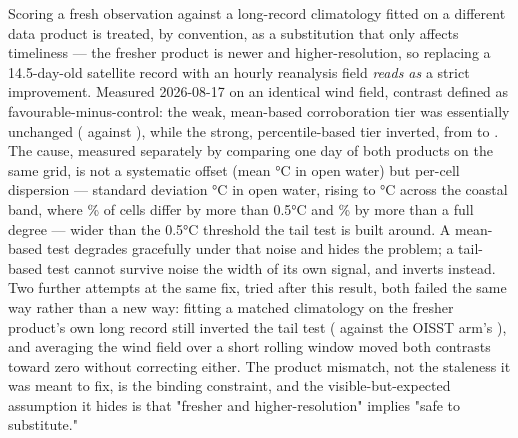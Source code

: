  Scoring a fresh observation against a long-record climatology
fitted on a different data product is treated, by convention, as a
substitution that only affects timeliness --- the fresher product is newer
and higher-resolution, so replacing a 14.5-day-old satellite record with an
hourly reanalysis field \emph{reads as} a strict improvement. Measured
2026-08-17 on an identical wind field, contrast defined as
favourable-minus-control: the weak, mean-based corroboration tier was
essentially unchanged (\SstWeakOISST{} against \SstWeakLive{}), while the
strong, percentile-based tier inverted, from \SstStrongOISST{} to
\SstStrongLive{}. The cause, measured separately by comparing one day of
both products on the same grid, is not a systematic offset (mean
\SstMeanOpen{}\si{\celsius} in open water) but per-cell dispersion ---
standard deviation \SstSDOpen{}\si{\celsius} in open water, rising to
\SstSDCoastal{}\si{\celsius} across the coastal band, where
\SstCoastalFracHalf{}\% of cells differ by more than 0.5\si{\celsius}
and \SstCoastalFracOne{}\% by more than a full degree --- wider than the
0.5\si{\celsius} threshold the tail test is built around. A mean-based
test degrades gracefully under that noise and hides the problem; a
tail-based test cannot survive noise the width of its own signal, and
inverts instead. Two further attempts at the same fix, tried after this
result, both failed the same way rather than a new way: fitting a matched
climatology on the fresher product's own long record still inverted the
tail test (\SstMatchedGLORYSStrong{} against the OISST arm's
\SstMatchedOISSTStrong{}), and averaging the wind field over a short rolling
window moved both contrasts toward zero without correcting either. The
product mismatch, not the staleness it was meant to fix, is the binding
constraint, and the visible-but-expected assumption it hides is that
"fresher and higher-resolution" implies "safe to substitute."

